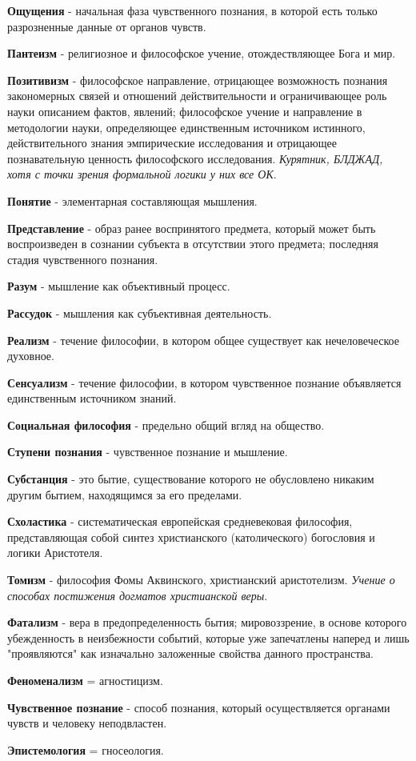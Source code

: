 \textbf{Ощущения} -  начальная фаза чувственного познания, в которой есть только разрозненные данные от органов чувств.

\textbf{Пантеизм} -  религиозное и философское учение, отождествляющее Бога и мир.

\textbf{Позитивизм} - философское направление, отрицающее возможность познания закономерных связей и отношений действительности и ограничивающее роль науки описанием фактов, явлений; философское учение и направление в методологии науки, определяющее единственным источником истинного, действительного знания эмпирические исследования и отрицающее познавательную ценность философского исследования. \textit{Курятник, БЛДЖАД, хотя с точки зрения формальной логики у них все ОК}.

\textbf{Понятие} - элементарная составляющая мышления.

\textbf{Представление} - образ ранее воспринятого предмета, который может быть воспроизведен в сознании субъекта в отсутствии этого предмета; последняя стадия чувственного познания.

\textbf{Разум} - мышление как объективный процесс.

\textbf{Рассудок} - мышления как субъективная деятельность.

\textbf{Реализм} - течение философии, в котором общее существует как нечеловеческое духовное. 

\textbf{Сенсуализм} - течение философии, в котором чувственное познание объявляется единственным источником знаний.

\textbf{Социальная философия} - предельно общий вгляд на общество.

\textbf{Ступени познания} - чувственное познание и мышление.

\textbf{Субстанция} - это бытие, существование которого не обусловлено никаким другим бытием, находящимся за его пределами.

\textbf{Схоластика} - систематическая европейская средневековая философия, представляющая собой синтез христианского (католического) богословия и логики Аристотеля.

\textbf{Томизм} - философия Фомы Аквинского, христианский аристотелизм. \textit{Учение о способах постижения догматов христианской веры}.

\textbf{Фатализм} -  вера в предопределенность бытия; мировоззрение, в основе которого убежденность в неизбежности событий, которые уже запечатлены наперед и лишь "проявляются" как изначально заложенные свойства данного пространства.

\textbf{Феноменализм} = агностицизм.

\textbf{Чувственное познание} - способ познания, который осуществляется органами чувств и человеку неподвластен.

\textbf{Эпистемология} = гносеология.